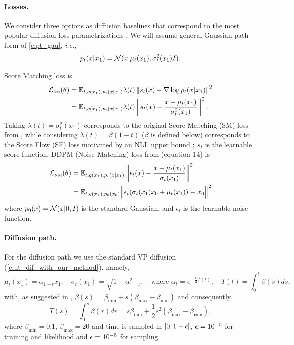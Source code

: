 \documentclass{article}
\makeatletter
\renewcommand*{\ie}{{\it i.e.}\@\xspace}
\makeatother
\begin{document}
{
\paragraph{Losses.}
We consider three options as diffusion baselines that correspond to the most popular diffusion loss parametrizations \citep{song2019score,song2021maximum,ho2020denoising,kingma2021vdm}. We will assume general Gaussian path form of \eqref{e:pt_gau}, \ie, 
\begin{equation*}
    p_t(x|x_1)={\mathcal{N}}(x|\mu_t(x_1),\sigma_t^2(x_1) I).
\end{equation*}

Score Matching loss is 
\begin{align}
    {\mathcal{L}}_{\scriptscriptstyle \text{SM}}(\theta) &= \mathbb{E}_{t,q(x_1),p_t(x|x_1)} \lambda(t) \left\Vert s_t(x) - \nabla \log p_t(x|x_1)\right\Vert^2 \\
    &= \mathbb{E}_{t,q(x_1),p_t(x|x_1)} \lambda(t) \left\Vert s_t(x) - \frac{x-\mu_t(x_1)}{\sigma_t^2(x_1)}\right\Vert^2.
\end{align}
Taking $\lambda(t) = \sigma_t^{2}(x_1)$ corresponds to the original Score Matching (SM) loss from \cite{song2019score}, while considering $\lambda(t)=\beta(1-t)$ ($\beta$ is defined below) corresponds to the Score Flow (SF) loss motivated by an NLL upper bound \citep{song2021maximum}; $s_t$ is the learnable score function. DDPM (Noise Matching) loss from \cite{ho2020denoising} (equation 14) is
\begin{align}
    {\mathcal{L}}_{\scriptscriptstyle \text{NM}}(\theta)  &= \mathbb{E}_{t,q(x_1),p_t(x|x_1)}  \left\Vert\epsilon_t(x) - \frac{x-\mu_t(x_1)}{\sigma_t(x_1)} \right\Vert^2 \\
    &= 
    \mathbb{E}_{t,q(x_1),p_0(x_0)} \Big \|  {\epsilon_t(\sigma_t(x_1) x_0 + \mu_t(x_1)) - x_0 }\Big \|^2
\end{align}
where $p_0(x)={\mathcal{N}}(x|0,I)$ is the standard Gaussian, and $\epsilon_t$ is the learnable noise function.

\paragraph{Diffusion path.} For the diffusion path we use the standard VP diffusion (\eqref{e:ut_dif_with_our_method}), namely,
\begin{equation*}
    \mu_t(x_1) = \alpha_{1-t}x_1, \quad \sigma_t(x_1) = \sqrt{1-\alpha_{1-t}^2},\quad  \text{where } \alpha_t = e^{-\frac{1}{2}T(t)},\quad  T(t)=\int_0^{t} \beta(s)ds,
\end{equation*}
with, as suggested in \cite{song2020score}, $\beta(s) = \beta_{\min} + s(\beta_{\max}-\beta_{\min})$ and consequently 
$$T(s) = \int_0^s \beta(r)dr = s\beta_{\min} + \frac{1}{2}s^2(\beta_{\max} - \beta_{\min}),$$
where $\beta_{\min}=0.1$, $\beta_{\max}=20$ and time is sampled in $[0,1-{\epsilon}]$, ${\epsilon}=10^{-5}$ for training and likelihood and ${\epsilon}=10^{-5}$ for sampling.

}
\end{document}
